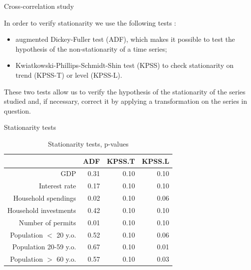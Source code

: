 \documentclass[11pt,ignorenonframetext,]{beamer}
\providecommand{\tightlist}{%
  \setlength{\itemsep}{0pt}\setlength{\parskip}{0pt}}
\begin{document}
\begin{frame}{Cross-correlation study}
\protect\hypertarget{cross-correlation-study}{}

In order to verify stationarity we use the following tests :

\begin{itemize}
\tightlist
\item
  augmented Dickey-Fuller test (ADF), which makes it possible to test
  the hypothesis of the non-stationarity of a time series;
\item
  Kwiatkowski-Phillips-Schmidt-Shin test (KPSS) to check stationarity on
  trend (KPSS-T) or level (KPSS-L).
\end{itemize}

These two tests allow us to verify the hypothesis of the stationarity of
the series studied and, if necessary, correct it by applying a
transformation on the series in question.

\end{frame}

\begin{frame}{Stationarity tests}
\protect\hypertarget{stationarity-tests}{}

\FloatBarrier

\tiny

\begin{table}[ht]
\centering
\begin{tabular}{rrrr}
  \hline
 & ADF & KPSS.T & KPSS.L \\ 
  \hline
GDP & 0.31 & 0.10 & 0.10 \\ 
  Interest rate & 0.17 & 0.10 & 0.10 \\ 
  Household spendings & 0.02 & 0.10 & 0.06 \\ 
  Household investments & 0.42 & 0.10 & 0.10 \\ 
  Number of permits & 0.01 & 0.10 & 0.10 \\ 
  Population $<$ 20 y.o. & 0.52 & 0.10 & 0.06 \\ 
  Population 20-59 y.o. & 0.67 & 0.10 & 0.01 \\ 
  Population $>$ 60 y.o. & 0.57 & 0.10 & 0.03 \\ 
   \hline
\end{tabular}
\caption{Stationarity tests, p-values} 
\end{table}

\normalsize

\FloatBarrier

\end{frame}
\end{document}
